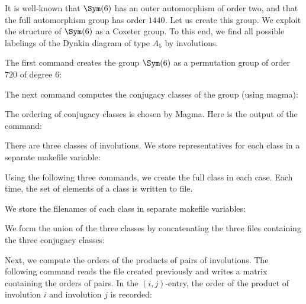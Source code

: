 It is well-known that $\Sym(6)$ has an outer automorphism of order two, 
and that the full automorphism group has order $1440$.
Let us create this group.
We exploit the structure of $\Sym(6)$ as a Coxeter group. 
To this end, we find all possible labelings of 
the Dynkin diagram of type $A_5$ by involutions.

\bigskip

The first command creates the group $\Sym(6)$ as a permutation group of order $720$ of degree $6$:


The next command computes the conjugacy classes of the group (using magma):


The ordering of conjugacy classes is chosen by Magma. 
Here is the output of the command:



\bigskip

There are three classes of involutions. 
We store representatives for each class in a separate makefile variable:








Using the following three commands, 
we create the full class in each case. Each time, the 
set of elements of a class is written to file.





We store the filenames of each class in separate makefile variables:





We form the union of the three classes by concatenating the three files containing the three conjugacy classes: 



Next, we compute the orders of the products of pairs of involutions.
The following command reads the file created previously and writes a matrix containing the orders of pairs.
In the $(i,j)$-entry, the order of the product of involution $i$ and involution $j$ is recorded:

